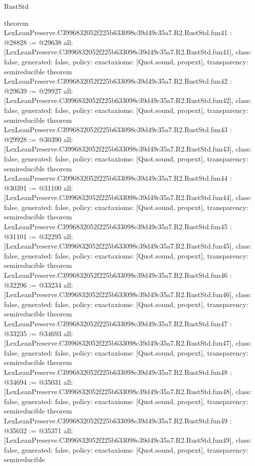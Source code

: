 \begin{lexlean}{RustStd}
\begin{coremodule}
{}
theorem LexLeanPreserve.C3996832052f225b633098c39d49c35a7.R2.RustStd.fun41 : @28828 := @29638 {
  all: [LexLeanPreserve.C3996832052f225b633098c39d49c35a7.R2.RustStd.fun41],
  class: false,
  generated: false,
  policy: exact{axioms: [Quot.sound, propext]},
  transparency: semireducible
}
theorem LexLeanPreserve.C3996832052f225b633098c39d49c35a7.R2.RustStd.fun42 : @29639 := @29927 {
  all: [LexLeanPreserve.C3996832052f225b633098c39d49c35a7.R2.RustStd.fun42],
  class: false,
  generated: false,
  policy: exact{axioms: [Quot.sound, propext]},
  transparency: semireducible
}
theorem LexLeanPreserve.C3996832052f225b633098c39d49c35a7.R2.RustStd.fun43 : @29928 := @30390 {
  all: [LexLeanPreserve.C3996832052f225b633098c39d49c35a7.R2.RustStd.fun43],
  class: false,
  generated: false,
  policy: exact{axioms: [Quot.sound, propext]},
  transparency: semireducible
}
theorem LexLeanPreserve.C3996832052f225b633098c39d49c35a7.R2.RustStd.fun44 : @30391 := @31100 {
  all: [LexLeanPreserve.C3996832052f225b633098c39d49c35a7.R2.RustStd.fun44],
  class: false,
  generated: false,
  policy: exact{axioms: [Quot.sound, propext]},
  transparency: semireducible
}
theorem LexLeanPreserve.C3996832052f225b633098c39d49c35a7.R2.RustStd.fun45 : @31101 := @32295 {
  all: [LexLeanPreserve.C3996832052f225b633098c39d49c35a7.R2.RustStd.fun45],
  class: false,
  generated: false,
  policy: exact{axioms: [Quot.sound, propext]},
  transparency: semireducible
}
theorem LexLeanPreserve.C3996832052f225b633098c39d49c35a7.R2.RustStd.fun46 : @32296 := @33234 {
  all: [LexLeanPreserve.C3996832052f225b633098c39d49c35a7.R2.RustStd.fun46],
  class: false,
  generated: false,
  policy: exact{axioms: [Quot.sound, propext]},
  transparency: semireducible
}
theorem LexLeanPreserve.C3996832052f225b633098c39d49c35a7.R2.RustStd.fun47 : @33235 := @34693 {
  all: [LexLeanPreserve.C3996832052f225b633098c39d49c35a7.R2.RustStd.fun47],
  class: false,
  generated: false,
  policy: exact{axioms: [Quot.sound, propext]},
  transparency: semireducible
}
theorem LexLeanPreserve.C3996832052f225b633098c39d49c35a7.R2.RustStd.fun48 : @34694 := @35031 {
  all: [LexLeanPreserve.C3996832052f225b633098c39d49c35a7.R2.RustStd.fun48],
  class: false,
  generated: false,
  policy: exact{axioms: [Quot.sound, propext]},
  transparency: semireducible
}
theorem LexLeanPreserve.C3996832052f225b633098c39d49c35a7.R2.RustStd.fun49 : @35032 := @35371 {
  all: [LexLeanPreserve.C3996832052f225b633098c39d49c35a7.R2.RustStd.fun49],
  class: false,
  generated: false,
  policy: exact{axioms: [Quot.sound, propext]},
  transparency: semireducible
}
\end{coremodule}
\end{lexlean}
